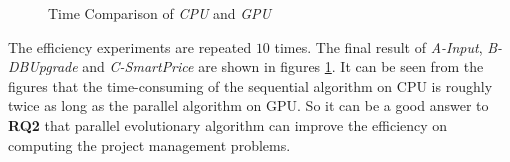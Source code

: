 \begin{figure}[!ht]
  \centering
  \caption{Time Comparison of \emph{CPU} and \emph{GPU}}
  \label{fig:co}
\end{figure}



The efficiency experiments are repeated $10$ times.  The final result of
\emph{A-Input}, \emph{B-DBUpgrade} and \emph{C-SmartPrice} are shown in figures
\ref{fig:co}. It can be seen from the figures that the time-consuming of the
sequential algorithm on CPU is roughly twice as long as the parallel algorithm
on GPU. So it can be a good answer to \textbf{RQ2} that parallel evolutionary
algorithm can improve the efficiency on computing the project management
problems.

